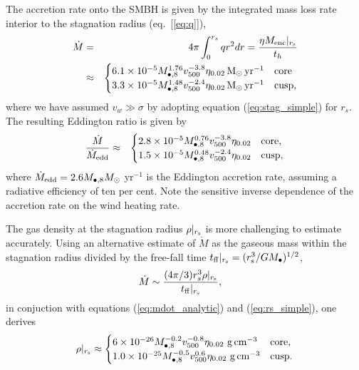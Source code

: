 \documentclass[usenatbib,fleqn]{mn2e}
\newcommand{\rs}{r_s}
\newcommand{\Menc}{M_{\rm enc}}
\newcommand{\Mbheight}{M_{\bullet,8}}
\newcommand{\pyear}{{\rm yr}^{-1}}
\renewcommand{\th}{t_h}
\newcommand{\tff}{t_{\rm ff}}
\begin{document}
The accretion rate onto the SMBH is given by the integrated mass loss rate interior to the stagnation radius (eq.~[\ref{eq:q}]), 
\begin{eqnarray}
  \dot{M} &=& 4\pi \int_{0}^{r_{s}}q r^{2}dr = \frac{\eta \Menc|_{r_{\rm s}}}{\th} \nonumber \\
&\approx&
  \begin{cases}
    6.1 \times 10^{-5} M_{\bullet,8}^{1.76}
    v_{500}^{-3.8}  \eta_{0.02} \Msun \, \pyear& \text{core} \\
    3.3 \times 10^{-5} M_{\bullet,8}^{1.48} 
    v_{500}^{-2.4}  \eta_{0.02} \Msun \, \pyear  & \text{cusp}, 
  \end{cases}
  \label{eq:mdot_analytic}
\end{eqnarray}
where we have assumed $v_{w} \gg \sigma$ by adopting equation (\ref{eq:stag_simple}) for $r_s$.  The resulting Eddington ratio is given by 
\begin{eqnarray}
\frac{\dot{M}}{\dot{M}_{\rm edd}} &\approx&
  \begin{cases}
    2.8 \times 10^{-5} M_{\bullet,8}^{0.76}
    v_{500}^{-3.8}  \eta_{0.02}   & \text{core}, \\
    1.5 \times 10^{-5} \Mbheight^{0.48} 
    v_{500}^{-2.4}  \eta_{0.02}   & \text{cusp}, 
  \end{cases}
  \label{eq:eddr_analytic}
\end{eqnarray}
where $\dot{M}_{\rm edd} = 2.6M_{\bullet,8}M_{\odot}$ yr$^{-1}$  is the Eddington accretion rate, assuming a radiative efficiency of ten per cent.  Note the sensitive inverse dependence of the accretion rate on the wind heating rate.  

The gas density at the stagnation radius $\rho|_{r_{\rm s}}$ is more challenging to estimate accurately.  Using an alternative estimate of $\dot{M}$ as the gaseous mass within the stagnation radius divided by the free-fall time $t_{\rm ff}|_{r_{\rm s}} = (r_{\rm s}^{3}/GM_{\bullet})^{1/2}$,
\begin{align}
  &\dot{M}\sim\frac{(4 \pi/3) \rs^3 \rho|_{r_{\rm s}}}{\tff|_{r_{\rm s}}},
  \label{eq:mdot_gas}
\end{align}
 in conjuction with equations (\ref{eq:mdot_analytic}) and (\ref{eq:rs_simple}), one derives
\begin{align}
  \rho|_{r_{\rm s}}\approx
  \begin{cases}
    6 \times 10^{-26} \Mbheight^{-0.2} v_{500}^{-0.8}  \eta_{0.02} \,
    \, {\rm g \, cm^{-3}}& \text{core},\\
    1.0 \times 10^{-25}  \Mbheight^{-0.5} v_{500}^{0.6}  \eta_{0.02} \,\, {\rm g \,cm^{-3}} & \text{cusp}.
  \end{cases}
  \label{eq:rhors}
\end{align}
\end{document}

